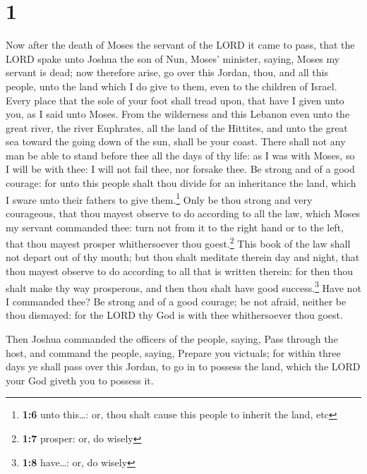 \hypertarget{section}{%
\section{1}\label{section}}

 Now after the death of Moses the servant of the LORD it
came to pass, that the LORD spake unto Joshua the son of Nun, Moses'
minister, saying,  Moses my servant is dead; now therefore
arise, go over this Jordan, thou, and all this people, unto the land
which I do give to them, even to the children of Israel. 
Every place that the sole of your foot shall tread upon, that have I
given unto you, as I said unto Moses.  From the wilderness
and this Lebanon even unto the great river, the river Euphrates, all the
land of the Hittites, and unto the great sea toward the going down of
the sun, shall be your coast.  There shall not any man be
able to stand before thee all the days of thy life: as I was with Moses,
so I will be with thee: I will not fail thee, nor forsake thee.
 Be strong and of a good courage: for unto this people
shalt thou divide for an inheritance the land, which I sware unto their
fathers to give them.\footnote{\textbf{1:6} unto this\ldots: or, thou
  shalt cause this people to inherit the land, etc}  Only
be thou strong and very courageous, that thou mayest observe to do
according to all the law, which Moses my servant commanded thee: turn
not from it to the right hand or to the left, that thou mayest prosper
whithersoever thou goest.\footnote{\textbf{1:7} prosper: or, do wisely}
 This book of the law shall not depart out of thy mouth;
but thou shalt meditate therein day and night, that thou mayest observe
to do according to all that is written therein: for then thou shalt make
thy way prosperous, and then thou shalt have good success.\footnote{\textbf{1:8}
  have\ldots: or, do wisely}  Have not I commanded thee?
Be strong and of a good courage; be not afraid, neither be thou
dismayed: for the LORD thy God is with thee whithersoever thou goest.

 Then Joshua commanded the officers of the people,
saying,  Pass through the host, and command the people,
saying, Prepare you victuals; for within three days ye shall pass over
this Jordan, to go in to possess the land, which the LORD your God
giveth you to possess it.

